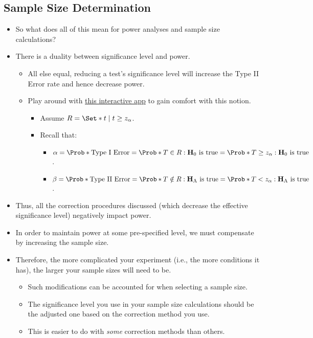 \subsection{Sample Size Determination}
\begin{itemize}
    \item So what does all of this mean for power analyses and sample size calculations?
    \item There is a duality between significance level and power.
          \begin{itemize}
              \item All else equal, reducing a test's significance level will increase the Type II Error rate and hence
                    decrease power.
              \item Play around with \href{https://nathaniel-t-stevens.shinyapps.io/ErrorIllustrator/}{this interactive app} to gain comfort with this notion.
                    \begin{itemize}
                        \item Assume $ \mathcal{R}=\Set*{t\mid t\ge z_\alpha} $.
                        \item Recall that: \begin{itemize}
                                  \item $ \alpha=\Prob*{\text{Type I Error}}=\Prob*{T\in\mathcal{R}\given \text{$ \mathbf{H}_0 $ is true}}=\Prob*{T\ge z_\alpha\given \text{$ \mathbf{H}_0 $ is true}}$.
                                  \item $ \beta=\Prob*{\text{Type II Error}}=\Prob*{T\notin\mathcal{R}\given \text{$ \mathbf{H}_\text{A} $ is true}}=\Prob*{T< z_\alpha\given \text{$ \mathbf{H}_\text{A} $ is true}} $.
                              \end{itemize}
                    \end{itemize}
          \end{itemize}
    \item Thus, all the correction procedures discussed (which decrease the effective significance level)
          negatively impact power.
    \item In order to maintain power at some pre-specified level, we must compensate by increasing the sample
          size.
    \item Therefore, the more complicated your experiment (i.e., the more conditions it has), the larger your
          sample sizes will need to be.
          \begin{itemize}
              \item Such modifications can be accounted for when selecting a sample size.
              \item The significance level you use in your sample size calculations should be the adjusted one based
                    on the correction method you use.
              \item This is easier to do with \emph{some} correction methods than others.
          \end{itemize}
\end{itemize}
